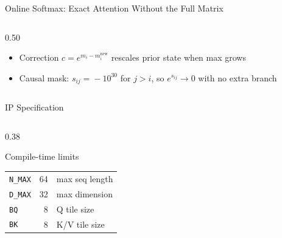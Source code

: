 \documentclass[aspectratio=169, 10pt]{beamer}
\begin{document}
\begin{frame}{Online Softmax: Exact Attention Without the Full Matrix}
\begin{columns}[T]
\begin{column}{0.50\textwidth}
      \vspace{0.3cm}
      \begin{itemize}\setlength\itemsep{3pt}
        \item Correction $c\!=\!e^{m_i-m_i^{\mathrm{new}}}$ rescales prior
              state when max grows
        \item Causal mask: $s_{ij}\!=\!-10^{30}$ for $j{>}i$,
              so $e^{s_{ij}}\!\to\!0$ with no extra branch
      \end{itemize}
    \end{column}
  \end{columns}
\end{frame}

\begin{frame}{IP Specification}
  \begin{columns}[T]
    \begin{column}{0.38\textwidth}
      \begin{block}{Compile-time limits}
        \vspace{2pt}
        \begin{tabular}{lrl}
          \texttt{N\_MAX} & 64 & max seq length \\
          \texttt{D\_MAX} & 32 & max dimension  \\
          \texttt{BQ}     &  8 & Q tile size    \\
          \texttt{BK}     &  8 & K/V tile size  \\
        \end{tabular}
        \vspace{2pt}
      \end{block}


\end{column}
\end{columns}
\end{frame}
\end{document}
